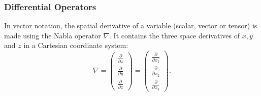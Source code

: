 \subsubsection{Differential Operators}
%
%
	In vector notation, the spatial derivative of a variable (scalar, vector
    or tensor) is made using the Nabla operator $\nabla$. It contains the three
    space derivatives of $x, y$ and $z$ in a Cartesian coordinate system:
%
%
$$
  \nabla
=
  \left(
  \begin{matrix}
    \frac{\partial}{\partial x} \\
    \frac{\partial}{\partial y} \\
    \frac{\partial}{\partial z}
  \end{matrix}
  \right)
=
  \left(
  \begin{matrix}
    \frac{\partial}{\partial x_1} \\
    \frac{\partial}{\partial x_2} \\
    \frac{\partial}{\partial x_3}
  \end{matrix}
  \right) .
$$
%
%
%
%

